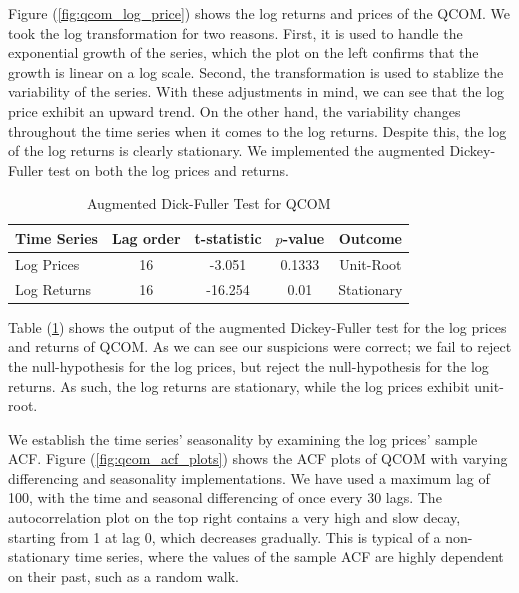 Figure (\ref{fig:qcom_log_price}) shows the log returns and prices of the QCOM. We took the log transformation for two reasons. First, it is used to handle the exponential growth of the series, which the plot on the left confirms that the growth is linear on a log scale. Second, the transformation is used to stablize the variability of the series. With these adjustments in mind, we can see that the log price exhibit an upward trend. On the other hand, the variability changes throughout the time series when it comes to the log returns. Despite this, the log of the log returns is clearly stationary. We implemented the augmented Dickey-Fuller test on both the log prices and returns.
\begin{table}[ht]
	\centering
	\caption{Augmented Dick-Fuller Test for QCOM}
	\begin{tabular}[t]{lcccc}
		\toprule
		Time Series &Lag order& t-statistic & $p$-value & Outcome  \\
		\midrule
		Log Prices & 16 & -3.051 & 0.1333 & Unit-Root  \\				
		Log Returns & 16 & -16.254 & 0.01 & Stationary  \\				
		\bottomrule
	\end{tabular}\label{tab:adftest}
\end{table}
Table (\ref{tab:adftest}) shows the output of the augmented Dickey-Fuller test for the log prices and returns of QCOM. As we can see our suspicions were correct; we fail to reject the null-hypothesis for the log prices, but reject the null-hypothesis for the log returns. As such, the log returns are stationary, while the log prices exhibit unit-root.

We establish the time series' seasonality by examining the log prices' sample ACF. Figure (\ref{fig:qcom_acf_plots}) shows the ACF plots of QCOM with varying differencing and seasonality implementations. We have used a maximum lag of 100, with the time and seasonal differencing of once every 30 lags. The autocorrelation plot on the top right contains a very high and slow decay, starting from 1 at lag 0, which decreases gradually. This is typical of a non-stationary time series, where the values of the sample ACF are highly dependent on their past, such as a random walk.


